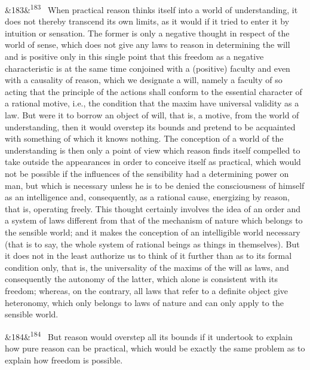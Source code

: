 \documentclass[12pt]{article}
\newcommand{\para}[1][]{\par\noindent\ifx&#1&\else\textsuperscript{\footnotesize #1}~\fi}
\begin{document}
\para[183] When practical reason thinks itself into a world of understanding, it does not thereby transcend its own limits, as it would if it tried to enter it by intuition or sensation. The former is only a negative thought in respect of the world of sense, which does not give any laws to reason in determining the will and is positive only in this single point that this freedom as a negative characteristic is at the same time conjoined with a (positive) faculty and even with a causality of reason, which we designate a will, namely a faculty of so acting that the principle of the actions shall conform to the essential character of a rational motive, i.e., the condition that the maxim have universal validity as a law. But were it to borrow an object of will, that is, a motive, from the world of understanding, then it would overstep its bounds and pretend to be acquainted with something of which it knows nothing. The conception of a world of the understanding is then only a point of view which reason finds itself compelled to take outside the appearances in order to conceive itself as practical, which would not be possible if the influences of the sensibility had a determining power on man, but which is necessary unless he is to be denied the consciousness of himself as an intelligence and, consequently, as a rational cause, energizing by reason, that is, operating freely. This thought certainly involves the idea of an order and a system of laws different from that of the mechanism of nature which belongs to the sensible world; and it makes the conception of an intelligible world necessary (that is to say, the whole system of rational beings as things in themselves). But it does not in the least authorize us to think of it further than as to its formal condition only, that is, the universality of the maxims of the will as laws, and consequently the autonomy of the latter, which alone is consistent with its freedom; whereas, on the contrary, all laws that refer to a definite object give heteronomy, which only belongs to laws of nature and can only apply to the sensible world.

\para[184] But reason would overstep all its bounds if it undertook to explain how pure reason can be practical, which would be exactly the same problem as to explain how freedom is possible.
\end{document}
